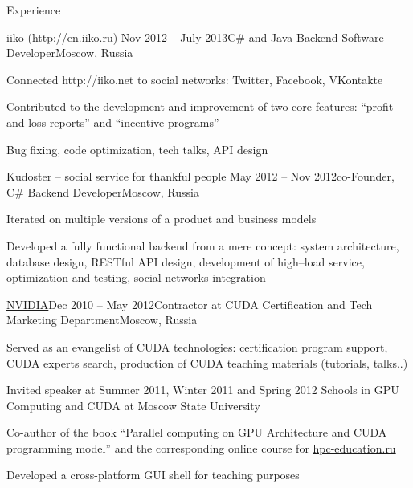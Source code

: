 \documentclass{resume} %
\begin{document}
\begin{rSection}{Experience}

\begin{rSubsection}
  {\href{http://en.iiko.ru}{iiko (http://en.iiko.ru)}}
  {Nov 2012 -- July 2013}{C\# and Java Backend Software Developer}{Moscow, Russia}
\item Connected http://iiko.net to social networks: Twitter, Facebook, VKontakte
\item Contributed to the development and improvement of two core features: ``profit and loss reports'' and ``incentive programs''
\item Bug fixing, code optimization, tech talks, API design
\end{rSubsection}


\begin{rSubsection}{Kudoster -- social service for thankful people}
 {May 2012 -- Nov 2012}{co-Founder, C\# Backend Developer}{Moscow, Russia}
\item Iterated on multiple versions of a product and business models
\item Developed a fully functional backend from a mere concept: system architecture, database design, RESTful API design, development of high–load service, optimization and testing, social networks integration
\end{rSubsection}


\begin{rSubsection}{\href{http://nvidia.ru}{NVIDIA}}{Dec 2010 -- May 2012}{Contractor at CUDA 
Certification and Tech Marketing Department}{Moscow, Russia}
\item Served as an evangelist of CUDA technologies: certification program support, CUDA experts search, production of CUDA teaching materials (tutorials, talks..)
\item Invited speaker at Summer 2011, Winter 2011 and Spring 2012 Schools in GPU Computing and CUDA at Moscow State University
\item Co-author of the book ``Parallel computing on GPU Architecture and CUDA programming model'' and the corresponding online course for \href{http://hpc-education.ru}{hpc-education.ru}
\item Developed a cross-platform GUI shell for teaching purposes
\end{rSubsection}



\end{rSection}
\end{document}
